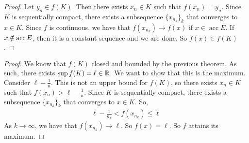 \documentclass{report}
\begin{document}
\begin{proof}
    Let $y_n \in f(K)$. Then there exists $x_n \in K$ such that $f(x_n) = y_n$. Since $K$ is sequentially compact, there exists a subsequence $\{x_{n_k}\}_k$ that converges to $x \in K$. Since $f$ is continuous, we have that $f(x_{n_k}) \to f(x)$ if $x \in \operatorname{acc}E$. If $x \notin \operatorname{acc} E$, then it is a constant sequence and we are done. So $f(x) \in f(K)$. 
\end{proof}
\begin{proof}
    We know that $f(K)$ closed and bounded by the previous theorem. As such, there exists $\sup f(K) = \ell \in \RR$. We want to show that this is the maximum. Consider $\ell - \frac{1}{n}$. This is not an upper bound for $f(K)$, so there exists $x_n \in K$ such that $f(x_n) > \ell - \frac{1}{n}$. Since $K$ is sequentially compact, there exists a subsequence $\{x_{n_k}\}_k$ that converges to $x \in K$. So, 
    \begin{align*}
        \ell - \frac{1}{n_k} < f(x_{n_k}) \leq \ell
    \end{align*}
    As $k \to \infty$, we have that $f(x_{n_k}) \to \ell$. So $f(x) = \ell$. So $f$ attains its maximum.
\end{proof}

\end{document}
